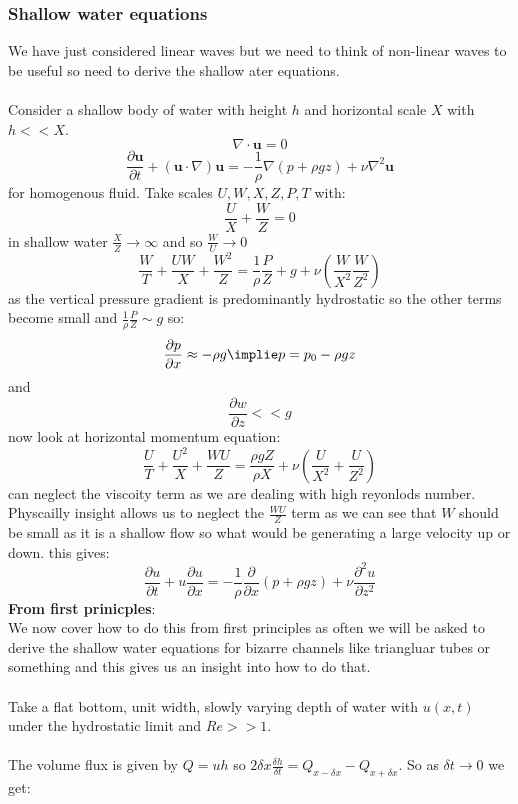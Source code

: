 \documentclass{article}
\begin{document}
\subsubsection{Shallow water equations}
We have just considered linear waves but we need to think of non-linear waves to be useful so need to derive the shallow ater equations.\\\\
Consider a shallow body of water with height $h$ and horizontal scale $X$ with $h << X$.
$$
\nabla \cdot \bm u = 0
$$
$$
 \frac{\partial \bm u}{\partial t} + ( \bm u \cdot \nabla) \bm u = - \frac{1}{\rho} \nabla ( p + \rho g z) + \nu \nabla^2 \bm u
$$
for homogenous fluid. Take scales $U, W, X, Z, P, T$ with:
$$
 \frac{U}{X} + \frac{W}{Z} = 0
$$
 in shallow water $\frac{X}{Z} \rightarrow \infty$ and so $\frac{W}{U} \rightarrow 0$
 $$
 \frac{W}{T} + \frac{UW}{X} + \frac{W^2}{Z} = \frac{1}{\rho}\frac{P}{Z} + g + \nu ( \frac{W}{X^2} \frac{W}{Z^2})
 $$
 as the vertical pressure gradient is predominantly hydrostatic so the other terms become small and $\frac{1}{\rho} \frac{P}{Z} \sim g$ so:
 $$ 
 \frac{\partial p}{\partial x} \approx - \rho g \implie p = p_0  - \rho g z
 $$
 and 
 $$
  \frac{\partial w}{\partial z} << g
 $$
 now look at horizontal momentum equation:
 $$
  \frac{U}{T} + \frac{U^2}{X} + \frac{ WU}{Z} = \frac{\rho g Z}{\rho X} + \nu ( \frac{U}{X^2} + \frac{U}{Z^2})
 $$
 can neglect the viscoity term as we are dealing with high reyonlods number. Physcailly insight allows us to neglect the $\frac{WU}{Z}$ term as we can see that $W$ should be small as it is a shallow flow so what would be generating a large velocity up or down. this gives:
 $$
  \frac{\partial u}{\partial t} + u \frac{\partial u}{\partial x} = - \frac{1}{\rho} \frac{\partial}{\partial x} ( p + \rho gz) + \nu \frac{\partial^2 u}{\partial z^2}
 $$
 \textbf{From first prinicples}:\\
 We now cover how to do this from first principles as often we will be asked to derive the shallow water equations for bizarre channels like triangluar tubes or something and this gives us an insight into how to do that.\\\\
 Take a flat bottom, unit width, slowly varying depth of water with $u(x,t)$ under the hydrostatic limit and $Re >>1$.\\\\
 The volume flux is given by $Q = uh$ so $2 \delta x \frac{\delta h}{\delta t} = Q_{x- \delta x} - Q_{x+ \delta x}$. So as $\delta t \rightarrow 0$ we get:
\end{document}
